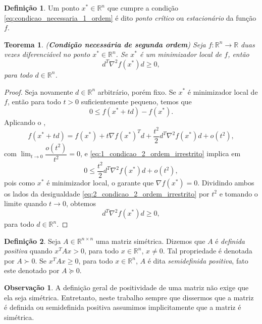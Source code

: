 \documentclass[12pt,a4paper]{scrartcl}
\def\RR{\mathds{R}}
\newtheorem{teo}{Teorema}
\theoremstyle{definition}%
\newtheorem{defi}{Definição}
\newtheorem{obs}{Observação}
\begin{document}
\begin{defi}\label{defi:ponto_critico}
Um ponto $x^{*} \in \RR^{n}$ que cumpre a condição \eqref{eq:condicao_necessaria_1_ordem} é dito \emph{ponto crítico} ou \emph{estacionário} da função $f$. 
\end{defi}


\begin{teo}(\textbf{Condição necessária de segunda ordem}) \label{teo:condicao_necessaria_2_ordem}
Seja $f:\RR^{n} \rightarrow \RR$ duas vezes diferenciável no ponto $x^{*} \in \RR^{n}$. Se $x^{*}$ é um minimizador local de $f$, então 
\[
d^{T} \nabla^{2} f(x^{*})d \geq 0,
\]
para todo $d \in \RR^{n}$.
\end{teo}
\begin{proof}
Seja novamente $d\in \RR^{n}$ arbitrário, porém fixo. Se $x^{*}$ é minimizador local de $f$, então para todo $t>0$ suficientemente pequeno, temos que
\[\label{eq:1_condicao_2_ordem_irrestrito}
0 \leq f(x^{*}+td) - f(x^{*}).
\]
Aplicando o ,
\[
f(x^{*}+td) = f(x^{*}) + t\nabla f(x^{*})^{T}d + \dfrac{t^{2}}{2} d^{T}\nabla^{2} f(x^{*})d + o(t^{2}),
\]
com $\lim_{t\rightarrow 0} \dfrac{o(t^{2})}{t^{2}} =0$, e  \eqref{eq:1_condicao_2_ordem_irrestrito} implica em
\[ \label{eq:2_condicao_2_ordem_irrestrito}
0 \leq \dfrac{t^{2}}{2} d^{T}\nabla^{2} f(x^{*})d + o(t^{2}),
\]
 pois como $x^{*}$ é minimizador local, o  garante que $\nabla f(x^{*}) =0$. Dividindo ambos os lados da desigualdade \eqref{eq:2_condicao_2_ordem_irrestrito} por $t^{2}$ e tomando o limite quando $t\rightarrow 0$, obtemos
\[
d^{T} \nabla^{2} f(x^{*})d \geq 0,
\]
para todo $d \in \RR^{n}$.
\end{proof}

\begin{defi} \label{defi:definida_positiva}
Seja $A \in \RR^{n\times n}$ uma matriz simétrica. Dizemos que $A$ é \emph{definida positiva} quando $x^{T}Ax >0$, para todo $x\in \RR^{n}$, $x \neq 0$. Tal propriedade é denotada por $A \succ 0$. Se $x^{T}Ax \geq 0$, para todo $x\in \RR^{n}$, $A$ é dita \emph{semidefinida positiva}, fato este denotado por $A \succcurlyeq 0$.
\end{defi}
\begin{obs}
A definição geral de positividade de uma matriz não exige que ela seja simétrica. Entretanto, neste trabalho sempre que dissermos que a matriz é definida ou semidefinida positiva assumimos implicitamente que a matriz é simétrica.
\end{obs}
\end{document}
